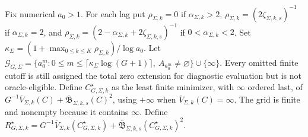 Fix numerical \(a_0>1\). For each lag put \(\rho_{\Sigma,k}=0\) if \(\alpha_{\Sigma,k}>2\), \(\rho_{\Sigma,k}=(2\zeta_{\Sigma,k,s})^{-1}\) if \(\alpha_{\Sigma,k}=2\), and \(\rho_{\Sigma,k}=(2-\alpha_{\Sigma,k}+2\zeta_{\Sigma,k,s})^{-1}\) if \(0<\alpha_{\Sigma,k}<2\). Set \(\kappa_\Sigma=(1+\max_{0\le k\le K}\rho_{\Sigma,k})/\log a_0\). Let \(\mathcal G_{G,\Sigma}=\{a_0^m:0\le m\le\lceil\kappa_\Sigma\log(G+1)\rceil,\ A_{a_0^m}\ne\varnothing\}\cup\{\infty\}\). Every omitted finite cutoff is still assigned the total zero extension for diagnostic evaluation but is not oracle-eligible. Define \(C_{G,\Sigma,k}^{\star}\) as the least finite minimizer, with \(\infty\) ordered last, of \(G^{-1}\overline V_{\Sigma,k}(C)+\overline{\mathfrak B}_{\Sigma,k,s}(C)^2\), using \(+\infty\) when \(\overline V_{\Sigma,k}(C)=\infty\). The grid is finite and nonempty because it contains \(\infty\). Define \(R_{G,\Sigma,k}^{\star}=G^{-1}\overline V_{\Sigma,k}(C_{G,\Sigma,k}^{\star})+\overline{\mathfrak B}_{\Sigma,k,s}(C_{G,\Sigma,k}^{\star})^2\).